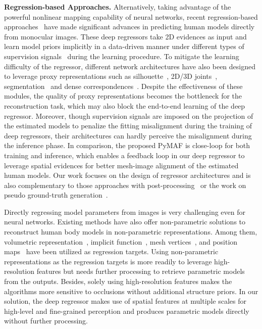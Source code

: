 \documentclass[10pt,twocolumn,letterpaper]{article}
\begin{document}
\textbf{Regression-based Approaches.}
Alternatively, taking advantage of the powerful nonlinear mapping capability of neural networks, recent regression-based approaches~\cite{kanazawa2018end,pavlakos2018learning,omran2018neural,kolotouros2019learning,choutas2020monocular,jiang2020coherent,choi2020pose2mesh} have made significant advances in predicting human models directly from monocular images.
These deep regressors take 2D evidences as input and learn model priors implicitly in a data-driven manner under different types of supervision signals~\cite{tung2017self,kanazawa2018end,pavlakos2019texturepose,rong2019delving,doersch2019sim2real,zanfir2020weakly,kundu2020appearance} during the learning procedure.
To mitigate the learning difficulty of the regressor, different network architectures have also been designed to leverage proxy representations such as silhouette~\cite{pavlakos2018learning,varol2018bodynet}, 2D/3D joints~\cite{tung2017self,pavlakos2018learning,moon2020i2l}, segmentation~\cite{omran2018neural,rueegg2020chained} and dense correspondences~\cite{xu2019denserac,zhang2019danet}.
Despite the effectiveness of these modules, the quality of proxy representations becomes the bottleneck for the reconstruction task, which may also block the end-to-end learning of the deep regressor.
Moreover, though supervision signals are imposed on the projection of the estimated models to penalize the fitting misalignment during the training of deep regressors, their architectures can hardly perceive the misalignment during the inference phase.
In comparison, the proposed PyMAF is close-loop for both training and inference, which enables a feedback loop in our deep regressor to leverage spatial evidences for better mesh-image alignment of the estimated human models.
Our work focuses on the design of regressor architectures and is also complementary to those approaches with post-processing~\cite{guler2019holopose} or the work on pseudo ground-truth generation~\cite{kolotouros2019learning,joo2020exemplar}.


Directly regressing model parameters from images is very challenging even for neural networks.
Existing methods have also offer non-parametric solutions to reconstruct human body models in non-parametric representations.
Among them, volumetric representation~\cite{varol2018bodynet,zheng2019deephuman}, implicit function~\cite{saito2019pifu}, mesh vertices~\cite{kolotouros2019convolutional,lin2020end}, and position maps~\cite{yao2019densebody,zhang2020object,zeng20203d} have been utilized as regression targets.
Using non-parametric representations as the regression targets is more readily to leverage high-resolution features but needs further processing to retrieve parametric models from the outputs.
Besides, solely using high-resolution features makes the algorithms more sensitive to occlusions without additional structure priors.
In our solution, the deep regressor makes use of spatial features at multiple scales for high-level and fine-grained perception and produces parametric models directly without further processing.
\end{document}
